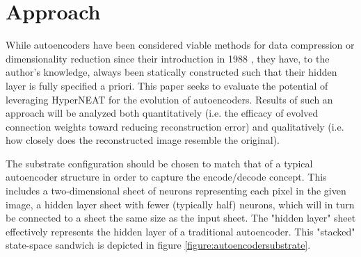 \documentclass{acm_proc_article-sp}
\begin{document}
\section{Approach}
While autoencoders have been considered viable methods for data compression or dimensionality reduction since their introduction in 1988 \cite{bourland1988}, they have, to the author's knowledge, always been statically constructed such that their hidden layer is fully specified a priori.  This paper seeks to evaluate the potential of leveraging HyperNEAT for the evolution of autoencoders.  Results of such an approach will be analyzed both quantitatively (i.e. the efficacy of evolved connection weights toward reducing reconstruction error) and qualitatively (i.e. how closely does the reconstructed image resemble the original).

The substrate configuration should be chosen to match that of a typical autoencoder structure in order to capture the encode/decode concept.  This includes a two-dimensional sheet of neurons representing each pixel in the given image, a hidden layer sheet with fewer (typically half) neurons, which will in turn be connected to a sheet the same size as the input sheet.  The "hidden layer" sheet effectively represents the hidden layer of a traditional autoencoder.  This "stacked" state-space sandwich is depicted in figure \ref{figure:autoencodersubstrate}.
\end{document}
